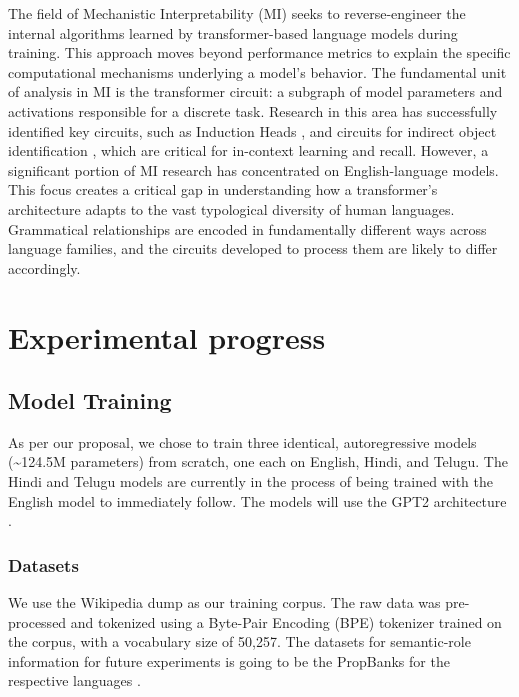 \documentclass[11pt]{article}
\begin{document}
The field of Mechanistic Interpretability (MI) seeks to reverse-engineer the internal algorithms learned by transformer-based language models during training. This approach moves beyond performance metrics to explain the specific computational mechanisms underlying a model's behavior. The fundamental unit of analysis in MI is the transformer circuit: \citep{elhage2021mathematical} a subgraph of model parameters and activations responsible for a discrete task. Research in this area has successfully identified key circuits, such as Induction Heads \citep{olsson.etal2022}, and circuits for indirect object identification \citep{wang.etal2022}, which are critical for in-context learning and recall. However, a significant portion of MI research has concentrated on English-language models. This focus creates a critical gap in understanding how a transformer's architecture adapts to the vast typological diversity of human languages. Grammatical relationships are encoded in fundamentally different ways across language families, and the circuits developed to process them are likely to differ accordingly.
\section*{Experimental progress}
\label{sec:org904fcc7}

\subsection*{Model Training}
\label{sec:orgcfa1fe7}

As per our proposal, we chose to train three identical, autoregressive models (\textasciitilde{}124.5M parameters) from scratch, one each on English, Hindi, and Telugu. The Hindi and Telugu models are currently in the process of being trained with the English model to immediately follow. The models will use the GPT2 architecture \citep{Radford2019LanguageMA}.
\subsubsection*{Datasets}
\label{sec:org6736841}

We use the Wikipedia dump \citep{wikidump} as our training corpus. The raw data was pre-processed and tokenized using a Byte-Pair Encoding (BPE) tokenizer trained on the corpus, with a vocabulary size of 50,257.
The datasets for semantic-role information for future experiments is going to be the PropBanks for the respective languages \citep{10.1162/0891201053630264,Bhat2017,jindal-EtAl:2022:LREC,akbik-etal-2015-generating}.
\end{document}
